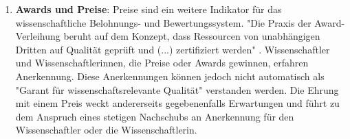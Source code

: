 \begin{enumerate}
\item \textbf{Awards und Preise}: Preise sind ein weitere Indikator für das wissenschaftliche Belohnungs- und Bewertungssystem. "Die Praxis der Award-Verleihung beruht auf dem Konzept, dass Ressourcen von unabhängigen Dritten auf Qualität geprüft und (...) zertifiziert werden" \cite{Bargheer_2002}. Wissenschaftler und Wissenschaftlerinnen, die Preise oder Awards gewinnen, erfahren Anerkennung. Diese Anerkennungen können jedoch nicht automatisch als "Garant für wissenschaftsrelevante Qualität" \cite{Bargheer_2002} verstanden werden. Die Ehrung mit einem Preis weckt andererseits gegebenenfalls Erwartungen und führt zu dem Anspruch eines stetigen Nachschubs an Anerkennung für den Wissenschaftler oder die Wissenschaftlerin.
\end{enumerate}
